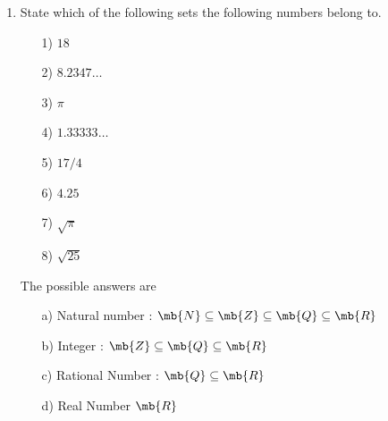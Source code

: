 \documentclass[]{report}
\begin{document}
\begin{enumerate}
	\item State which of the following sets the following numbers belong to. 
	\begin{multicols}{4}
		\begin{itemize}
			\item[1)] $18$
			\item[2)] $8.2347\ldots$
			\item[3)] $\pi$
			\item[4)] $1.33333\ldots$
			\item[5)] $17/4$
			\item[6)] $4.25$
			\item[7)] $\sqrt{\pi}$
			\item[8)] $\sqrt{25}$
		\end{itemize}
	\end{multicols}
	\bigskip
	The possible answers are
	
	\begin{itemize}
		\item[a)] Natural number : $\mb{N} \subseteq \mb{Z } \subseteq \mb{Q} \subseteq \mb{R}$
		\item[b)] Integer : $ \mb{Z } \subseteq \mb{Q} \subseteq \mb{R}$
		\item[c)] Rational Number : $ \mb{Q} \subseteq \mb{R}$
		\item[d)] Real Number $\mb{R}$
		
	\end{itemize}
	
\end{enumerate}
\end{document}
